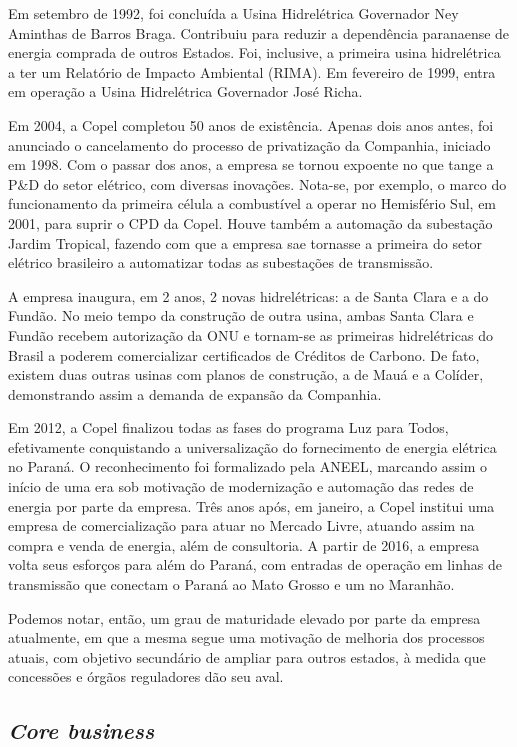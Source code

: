 \documentclass[grad,numbers]{coppe}
\begin{document}
  Em setembro de 1992, foi concluída a Usina Hidrelétrica Governador Ney Aminthas de Barros Braga. Contribuiu para reduzir a dependência paranaense de energia comprada de outros Estados. Foi, inclusive, a primeira usina hidrelétrica a ter um Relatório de Impacto Ambiental (RIMA). Em fevereiro de 1999, entra em operação a Usina Hidrelétrica Governador José Richa.

  Em 2004, a Copel completou 50 anos de existência. Apenas dois anos antes, foi anunciado o cancelamento do processo de privatização da Companhia, iniciado em 1998. Com o passar dos anos, a empresa se tornou expoente no que tange a P\&D do setor elétrico, com diversas inovações. Nota-se, por exemplo, o marco do funcionamento da primeira célula a combustível a operar no Hemisfério Sul, em 2001, para suprir o CPD da Copel. Houve também a automação da subestação Jardim Tropical, fazendo com que a empresa sae tornasse a primeira do setor elétrico brasileiro a automatizar todas as subestações de transmissão.

  A empresa inaugura, em 2 anos, 2 novas hidrelétricas: a de Santa Clara e a do Fundão. No meio tempo da construção de outra usina, ambas Santa Clara e Fundão recebem autorização da ONU e tornam-se as primeiras hidrelétricas do Brasil a poderem comercializar certificados de Créditos de Carbono. De fato, existem duas outras usinas com planos de construção, a de Mauá e a Colíder, demonstrando assim a demanda de expansão da Companhia.

  Em 2012, a Copel finalizou todas as fases do programa Luz para Todos, efetivamente conquistando a universalização do fornecimento de energia elétrica no Paraná. O reconhecimento foi formalizado pela ANEEL, marcando assim o início de uma era sob motivação de modernização e automação das redes de energia por parte da empresa. Três anos após, em janeiro, a Copel institui uma empresa de comercialização para atuar no Mercado Livre, atuando assim na compra e venda de energia, além de consultoria. A partir de 2016, a empresa volta seus esforços para além do Paraná, com entradas de operação em linhas de transmissão que conectam o Paraná ao Mato Grosso e um no Maranhão.

  Podemos notar, então, um grau de maturidade elevado por parte da empresa atualmente, em que a mesma segue uma motivação de melhoria dos processos atuais, com objetivo secundário de ampliar para outros estados, à medida que concessões e órgãos reguladores dão seu aval.

  \hypertarget{core-business}{%
  \subsection{\texorpdfstring{\emph{Core business}}{Core business}}\label{core-business}}
\end{document}
